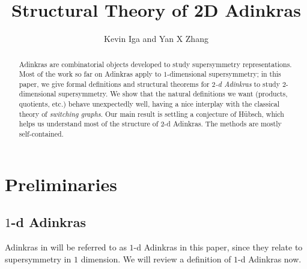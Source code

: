 \documentclass[12pt,twoside,singlespace]{article}
\title{Structural Theory of 2D Adinkras}
\author{Kevin Iga and Yan X Zhang}
\numberwithin{equation}{section}
\theoremstyle{definition}
\begin{document}
\pagestyle{plain}

\maketitle

\begin{abstract}
Adinkras are combinatorial objects developed to study supersymmetry representations. Most of the work so far on Adinkras apply to $1$-dimensional supersymmetry; in this paper, we give formal definitions and structural theorems for \emph{$2$-d Adinkras} to study $2$-dimensional supersymmetry. We show that the natural definitions we want (products, quotients, etc.) behave unexpectedly well, having a nice interplay with the classical theory of \emph{switching graphs}. Our main result is settling a conjecture of H\"ubsch, which helps us understand most of the structure of $2$-d Adinkras. The methods are mostly self-contained.
\end{abstract}

\section{Preliminaries}

\subsection{$1$-d Adinkras}
Adinkras in \cite{d2l:first,d2l:graph-theoretic} will be referred to as $1$-d Adinkras in this paper, since they relate to supersymmetry in $1$ dimension.  We will review a definition of $1$-d Adinkras now.
\end{document}
